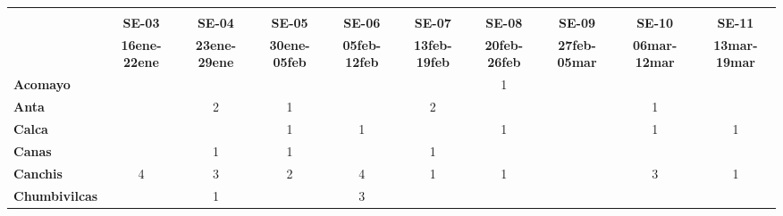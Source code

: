 \begin{tabular}{lccccccccc}
	\textbf{}              	  & \multicolumn{1}{l}{}                        & \multicolumn{1}{l}{}      & \multicolumn{1}{l}{}                         & \multicolumn{1}{l}{}                         & \multicolumn{1}{l}{}                         & \multicolumn{1}{l}{}                        & \multicolumn{1}{l}{}                         & \multicolumn{1}{l}{}                         & \multicolumn{1}{l}{}     \\
	\textbf{}                                                                               
	&\textbf{SE-03}
	&\textbf{SE-04}								&\textbf{SE-05}	
	&\textbf{SE-06}								&\textbf{SE-07}				&\textbf{SE-08}
	&\textbf{SE-09}								&\textbf{SE-10}
	&\textbf{SE-11}\\
	\textbf{}              	  	
	&\textbf{16ene-22ene}						&\textbf{23ene-29ene}						&\textbf{30ene-05feb}
	&\textbf{05feb-12feb}						&\textbf{13feb-19feb}
	&\textbf{20feb-26feb}						&\textbf{27feb-05mar}
	&\textbf{06mar-12mar}						&\textbf{13mar-19mar}\\
	\textbf{Acomayo}                        	
	&\cellcolor[HTML]{FCC46C}				    &\cellcolor[HTML]{FCC46C}
	&\cellcolor[HTML]{FCC46C}					&\cellcolor[HTML]{FCC46C}
	&\cellcolor[HTML]{FCC46C}					&1
	&\cellcolor[HTML]{FCC46C}					&\cellcolor[HTML]{FCC46C} 
	&\cellcolor[HTML]{FCC46C}\\
	\textbf{Anta}                                                          				
	&\cellcolor[HTML]{FCC46C}					&2 				
	&1											&\cellcolor[HTML]{FCC46C}					&2
	&\cellcolor[HTML]{FCC46C}					&\cellcolor[HTML]{FCC46C}					&1
	&\cellcolor[HTML]{FCC46C}\\
	\textbf{Calca}      				       								            &\cellcolor[HTML]{FCC46C}					&\cellcolor[HTML]{FCC46C}
	&1 											&1	
	&\cellcolor[HTML]{FCC46C}					&1											&\cellcolor[HTML]{FCC46C} 				&1											&1\\             			
	\textbf{Canas}                              		
	&\cellcolor[HTML]{FCC46C}					&1
	&1											&\cellcolor[HTML]{FCC46C}
	&1											&\cellcolor[HTML]{FCC46C}
	&\cellcolor[HTML]{FCC46C}					&\cellcolor[HTML]{FCC46C}
	&\cellcolor[HTML]{FCC46C} \\
	\textbf{Canchis}                             		
	&4											&3
	&2											&4
	&1											&1
	&\cellcolor[HTML]{FCC46C}					&3
	&1\\
	\textbf{Chumbivilcas}                      			
	&\cellcolor[HTML]{FCC46C} 					&1
	&\cellcolor[HTML]{FCC46C}					&3

\end{tabular}
